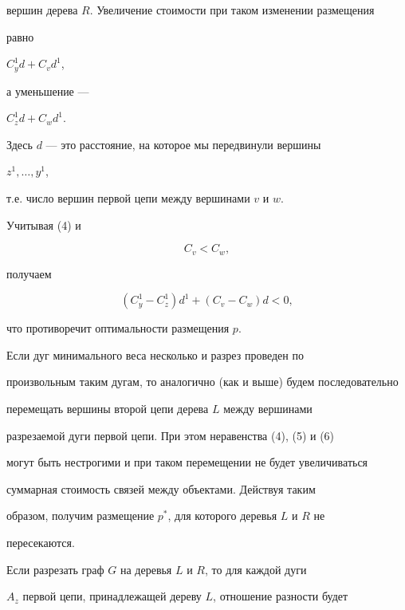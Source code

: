 \begin{pf}
вершин дерева $R$. Увеличение стоимости при таком изменении размещения


равно


$C^1_y d+C_v d^1$,


а уменьшение ---


$C^1_z d+C_w d^1$.


Здесь $d$ --- это расстояние, на которое мы передвинули вершины


$z^1,\dotsc,y^1$,


т.е. число вершин первой цепи между вершинами $v$ и $w$.


Учитывая (4) и


\begin{equation}


C_v < C_w,


\end{equation}


получаем


\begin{equation}


(C^1_y-C^1_z)d^1+(C_v-C_w)d<0,


\end{equation}


что противоречит оптимальности размещения $p$.





Если дуг минимального веса несколько и разрез проведен по


произвольным таким дугам, то аналогично (как и выше) будем последовательно


перемещать вершины второй цепи дерева $L$ между вершинами


разрезаемой дуги первой цепи. При этом неравенства (4), (5) и (6)


могут быть нестрогими и при таком перемещении не будет увеличиваться


суммарная стоимость связей между объектами. Действуя таким


образом, получим размещение $p^*$, для которого деревья $L$ и $R$ не


пересекаются.


\end{pf}





Если разрезать граф $G$ на деревья $L$ и $R$, то для каждой дуги


$A_z$ первой цепи, принадлежащей дереву $L$, отношение разности будет



